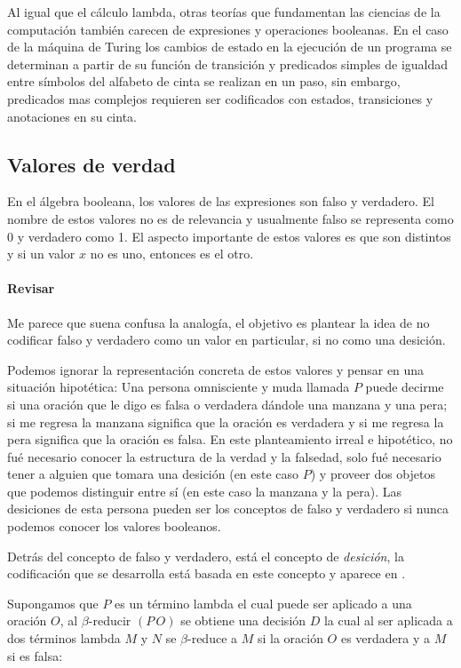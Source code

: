 Al igual que el cálculo lambda, otras teorías que fundamentan las ciencias de la computación también carecen de expresiones y operaciones booleanas. En el caso de la máquina de Turing los cambios de estado en la ejecución de un programa se determinan a partir de su función de transición y predicados simples de igualdad entre símbolos del alfabeto de cinta se realizan en un paso, sin embargo, predicados mas complejos requieren ser codificados con estados, transiciones y anotaciones en su cinta.

\subsection{Valores de verdad}
\label{sec:valores-de-verdad}

En el álgebra booleana, los valores de las expresiones son falso y verdadero. El nombre de estos valores no es de relevancia y usualmente falso se representa como 0 y verdadero como 1. El aspecto importante de estos valores es que son distintos y si un valor \( x \) no es uno, entonces es el otro.

\paragraph{Revisar} Me parece que suena confusa la analogía, el objetivo es plantear la idea de no codificar falso y verdadero como un valor en particular, si no como una desición.

Podemos ignorar la representación concreta de estos valores y pensar en una situación hipotética: Una persona omnisciente y muda llamada \( P \) puede decirme si una oración que le digo es falsa o verdadera dándole una manzana y una pera; si me regresa la manzana significa que la oración es verdadera y si me regresa la pera significa que la oración es falsa. En este planteamiento irreal e hipotético, no fué necesario conocer la estructura de la verdad y la falsedad, solo fué necesario tener a alguien que tomara una desición (en este caso \( P \)) y proveer dos objetos que podemos distinguir entre sí (en este caso la manzana y la pera). Las desiciones de esta persona pueden ser los conceptos de falso y verdadero si nunca podemos conocer los valores booleanos.

Detrás del concepto de falso y verdadero, está el concepto de \emph{desición}, la codificación que se desarrolla está basada en este concepto y aparece en \cite[p.~133]{Barendregt:Bible}.

Supongamos que \( P \) es un término lambda el cual puede ser aplicado a una oración \( O \), al \( β \)-reducir \( (P\, O) \) se obtiene una decisión \( D \) la cual al ser aplicada a dos términos lambda \( M \) y \( N \) se \( β \)-reduce a \( M \) si la oración \( O \) es verdadera y a \( M \) si es falsa:

